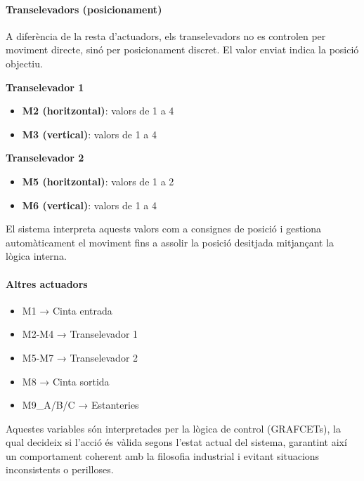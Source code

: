 \documentclass[12pt,a4paper]{report}
\begin{document}
\paragraph{Transelevadors (posicionament)}

A diferència de la resta d'actuadors, els transelevadors no es controlen per moviment directe, sinó per posicionament discret. El valor enviat indica la posició objectiu.

\textbf{Transelevador 1}
\begin{itemize}
\item \textbf{M2 (horitzontal)}: valors de 1 a 4
\item \textbf{M3 (vertical)}: valors de 1 a 4
\end{itemize}

\textbf{Transelevador 2}
\begin{itemize}
\item \textbf{M5 (horitzontal)}: valors de 1 a 2
\item \textbf{M6 (vertical)}: valors de 1 a 4
\end{itemize}

El sistema interpreta aquests valors com a consignes de posició i gestiona automàticament el moviment fins a assolir la posició desitjada mitjançant la lògica interna.

\paragraph{Altres actuadors}

\begin{itemize}
\item M1 → Cinta entrada
\item M2-M4 → Transelevador 1
\item M5-M7 → Transelevador 2
\item M8 → Cinta sortida
\item M9\_A/B/C → Estanteries
\end{itemize}

Aquestes variables són interpretades per la lògica de control (GRAFCETs), la qual decideix si l'acció és vàlida segons l'estat actual del sistema, garantint així un comportament coherent amb la filosofia industrial i evitant situacions inconsistents o perilloses.
\end{document}

